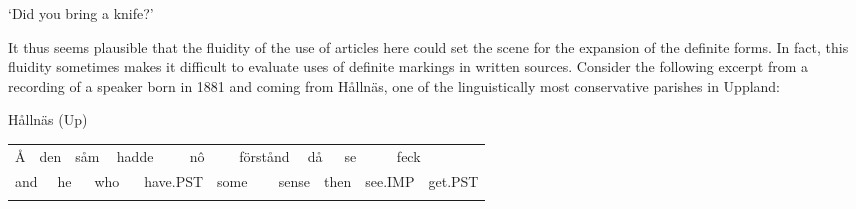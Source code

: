 \begin{styleTranslation}
‘Did you bring a knife?’

\end{styleTranslation}

\begin{styleBodyTextFirst}
It thus seems plausible that the fluidity of the use of articles here could set the scene for the expansion of the definite forms. In fact, this fluidity sometimes makes it difficult to evaluate uses of definite markings in written sources. Consider the following excerpt from a recording of a speaker born in 1881 and coming from Hållnäs, one of the linguistically most conservative parishes in Uppland:

\end{styleBodyTextFirst}

\begin{listWWNumileveli}
\item {}

\begin{styleExample}
\label{bkm:Ref123725093}Hållnäs (Up)

\end{styleExample}

\end{listWWNumileveli}

\begin{styleExText}

\end{styleExText}

\begin{tabular}{llllllllllllllllll}
\lsptoprule
Å & \multicolumn{2}{l}{den

} & \multicolumn{2}{l}{såm

} & \multicolumn{2}{l}{hadde

} & \multicolumn{2}{l}{nô

} & \multicolumn{2}{l}{förstånd

} & \multicolumn{2}{l}{då

} & \multicolumn{2}{l}{se

} & \multicolumn{2}{l}{feck

} & \\
\multicolumn{2}{l}{and

} & \multicolumn{2}{l}{he

} & \multicolumn{2}{l}{who

} & \multicolumn{2}{l}{have.PST

} & \multicolumn{2}{l}{some

} & \multicolumn{2}{l}{sense

} & \multicolumn{2}{l}{then

} & \multicolumn{2}{l}{see.IMP

} & \multicolumn{2}{l}{get.PST

}\\
\lspbottomrule
\end{tabular}

